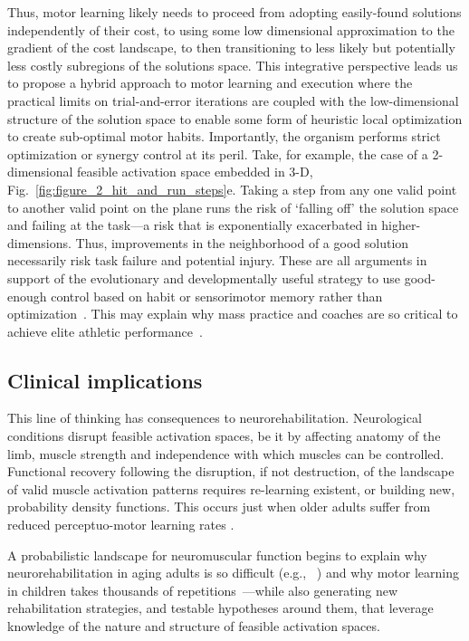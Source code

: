 \documentclass[letterpaper]{article}
\begin{document}
Thus, motor learning likely needs to proceed from adopting easily-found solutions independently of their cost, to using some low dimensional approximation to the gradient of the cost landscape, to then transitioning to less likely but potentially less costly subregions of the solutions space. This integrative perspective leads us to propose a hybrid approach to motor learning and execution where the practical limits on trial-and-error iterations are coupled with the low-dimensional structure of the solution space to enable some form of heuristic local optimization to create sub-optimal motor habits. Importantly, the organism performs strict optimization or synergy control at its peril. Take, for example, the case of a 2-dimensional feasible activation space embedded in 3-D, Fig.~\ref{fig:figure_2_hit_and_run_steps}e. Taking a step from any one valid point to another valid point on the plane runs the risk of `falling off' the solution space and failing at the task---a risk that is exponentially exacerbated in higher-dimensions. Thus, improvements in the neighborhood of a good solution necessarily risk task failure and potential injury. These are all arguments in support of the evolutionary and developmentally useful strategy to use good-enough control based on habit or sensorimotor memory rather than optimization~\cite{deRugy2012habitual, santello2012context}. This may explain why mass practice and coaches are so critical to achieve elite athletic performance~\cite{gladwell2008outliers}.

\subsection*{Clinical implications}
This line of thinking has consequences to neurorehabilitation. Neurological conditions disrupt feasible activation spaces, be it by affecting anatomy of the limb, muscle strength and independence with which muscles can be controlled. Functional recovery following the disruption, if not destruction, of the landscape of valid muscle activation patterns requires re-learning existent, or building new, probability density functions. This occurs just when older adults suffer from reduced perceptuo-motor learning rates \cite{coats201450scliff}.

A probabilistic landscape for neuromuscular function begins to explain why neurorehabilitation in aging adults is so difficult (e.g., ~\cite{hardwick2016motor}) and why motor learning in children takes thousands of repetitions~\cite{adolph2012thousands}---while also generating new rehabilitation strategies, and testable hypotheses around them, that leverage knowledge of the nature and structure of feasible activation spaces.
\end{document}
